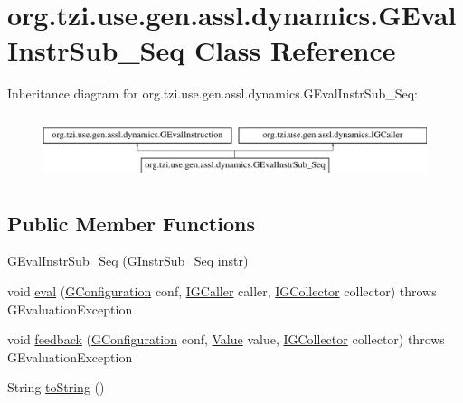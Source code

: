 \hypertarget{classorg_1_1tzi_1_1use_1_1gen_1_1assl_1_1dynamics_1_1_g_eval_instr_sub___seq}{\section{org.\-tzi.\-use.\-gen.\-assl.\-dynamics.\-G\-Eval\-Instr\-Sub\-\_\-\-Seq Class Reference}
\label{classorg_1_1tzi_1_1use_1_1gen_1_1assl_1_1dynamics_1_1_g_eval_instr_sub___seq}
}
Inheritance diagram for org.\-tzi.\-use.\-gen.\-assl.\-dynamics.\-G\-Eval\-Instr\-Sub\-\_\-\-Seq\-:\begin{figure}[H]
\begin{center}
\leavevmode
\includegraphics[height=1.872910cm]{classorg_1_1tzi_1_1use_1_1gen_1_1assl_1_1dynamics_1_1_g_eval_instr_sub___seq}
\end{center}
\end{figure}
\subsection*{Public Member Functions}
\begin{DoxyCompactItemize}
\item 
\hyperlink{classorg_1_1tzi_1_1use_1_1gen_1_1assl_1_1dynamics_1_1_g_eval_instr_sub___seq_aa3e8f5a3738832aecef1903e377b5c17}{G\-Eval\-Instr\-Sub\-\_\-\-Seq} (\hyperlink{classorg_1_1tzi_1_1use_1_1gen_1_1assl_1_1statics_1_1_g_instr_sub___seq}{G\-Instr\-Sub\-\_\-\-Seq} instr)
\item 
void \hyperlink{classorg_1_1tzi_1_1use_1_1gen_1_1assl_1_1dynamics_1_1_g_eval_instr_sub___seq_a541228a5be3da423c9bfdeb6cd57a1db}{eval} (\hyperlink{classorg_1_1tzi_1_1use_1_1gen_1_1assl_1_1dynamics_1_1_g_configuration}{G\-Configuration} conf, \hyperlink{interfaceorg_1_1tzi_1_1use_1_1gen_1_1assl_1_1dynamics_1_1_i_g_caller}{I\-G\-Caller} caller, \hyperlink{interfaceorg_1_1tzi_1_1use_1_1gen_1_1assl_1_1dynamics_1_1_i_g_collector}{I\-G\-Collector} collector)  throws G\-Evaluation\-Exception 
\item 
void \hyperlink{classorg_1_1tzi_1_1use_1_1gen_1_1assl_1_1dynamics_1_1_g_eval_instr_sub___seq_a1810e75230b676267982d97c7fd63476}{feedback} (\hyperlink{classorg_1_1tzi_1_1use_1_1gen_1_1assl_1_1dynamics_1_1_g_configuration}{G\-Configuration} conf, \hyperlink{classorg_1_1tzi_1_1use_1_1uml_1_1ocl_1_1value_1_1_value}{Value} value, \hyperlink{interfaceorg_1_1tzi_1_1use_1_1gen_1_1assl_1_1dynamics_1_1_i_g_collector}{I\-G\-Collector} collector)  throws G\-Evaluation\-Exception 
\item 
String \hyperlink{classorg_1_1tzi_1_1use_1_1gen_1_1assl_1_1dynamics_1_1_g_eval_instr_sub___seq_ac82da6029657cbcc7ae62088d02c1e6c}{to\-String} ()
\end{DoxyCompactItemize}
